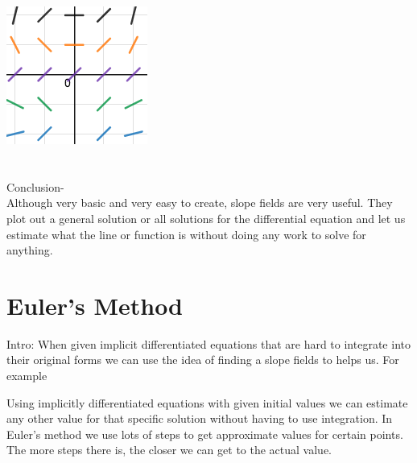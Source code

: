 \documentclass[a4paper,openright, 10pt]{article}
\begin{document}
 \includegraphics[width = 4 cm, height = 4 cm]{SF3.png}\\
 \\\\
 Conclusion-\\
 Although very basic and very easy to create, slope fields are very useful. They plot out a general solution or all solutions for the differential equation and let us estimate what the line or function is without doing any work to solve for anything.
 \section*{Euler's Method}
  Intro: When given implicit differentiated equations that are hard to integrate into their original forms we can use the idea of finding a slope fields to helps us. For example
  
  Using implicitly differentiated equations with given initial values we can estimate any other value for that specific solution without having to use integration. In Euler's method we use lots of steps to get approximate values for certain points. The more steps there is, the closer we can get to the actual value.\\
  
\end{document}
